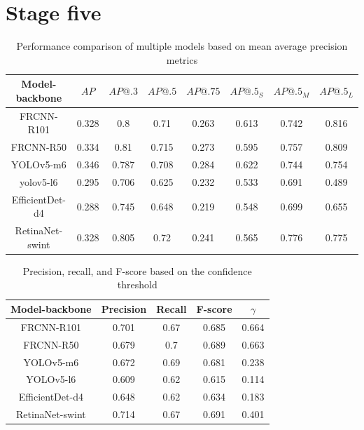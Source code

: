 \section{Stage five}

\begin{table}[H]
    \begin{tabular}{|c|c|c|c|c|c|c|c|}
        \hline
        Model-backbone  & $AP$  & $AP@.3$ & $AP@.5$ & $AP@.75$ & $AP@.5_S$ & $AP@.5_M$ & $AP@.5_L$ \\ \hline
        FRCNN-R101      & 0.328 & 0.8     & 0.71    & 0.263    & 0.613     & 0.742     & 0.816     \\ \hline
        FRCNN-R50       & 0.334 & 0.81    & 0.715   & 0.273    & 0.595     & 0.757     & 0.809     \\ \hline
        YOLOv5-m6       & 0.346 & 0.787   & 0.708   & 0.284    & 0.622     & 0.744     & 0.754     \\ \hline
        yolov5-l6       & 0.295 & 0.706   & 0.625   & 0.232    & 0.533     & 0.691     & 0.489     \\ \hline
        EfficientDet-d4 & 0.288 & 0.745   & 0.648   & 0.219    & 0.548     & 0.699     & 0.655     \\ \hline
        RetinaNet-swint & 0.328 & 0.805   & 0.72    & 0.241    & 0.565     & 0.776     & 0.775     \\ \hline
    \end{tabular}
    \caption{Performance comparison of multiple models based on mean average precision metrics}
    \label{tab:model_results:stage_five}
\end{table}

\begin{table}[H]
    \begin{tabular}{|c|c|c|c|c|}
        \hline
        Model-backbone  & Precision & Recall & F-score & $\gamma$ \\ \hline
        FRCNN-R101      & 0.701     & 0.67   & 0.685   & 0.664    \\ \hline
        FRCNN-R50       & 0.679     & 0.7    & 0.689   & 0.663    \\ \hline
        YOLOv5-m6       & 0.672     & 0.69   & 0.681   & 0.238    \\ \hline
        YOLOv5-l6       & 0.609     & 0.62   & 0.615   & 0.114    \\ \hline
        EfficientDet-d4 & 0.648     & 0.62   & 0.634   & 0.183    \\ \hline
        RetinaNet-swint & 0.714     & 0.67   & 0.691   & 0.401    \\ \hline
    \end{tabular}
    \caption{Precision, recall, and F-score based on the confidence threshold}
    \label{tab:model_prf:stage_five}
\end{table}

